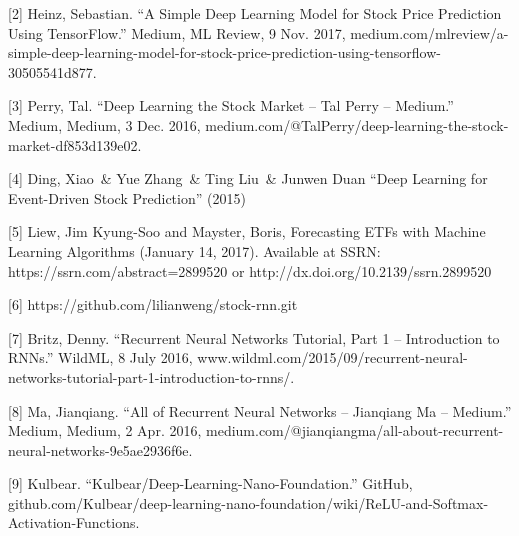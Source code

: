 \documentclass{article}
\begin{document}
[2] Heinz, Sebastian. “A Simple Deep Learning Model for Stock Price Prediction Using TensorFlow.” Medium, ML Review, 9 Nov. 2017, medium.com/mlreview/a-simple-deep-learning-model-for-stock-price-prediction-using-tensorflow-30505541d877.

[3] Perry, Tal. “Deep Learning the Stock Market – Tal Perry – Medium.” Medium, Medium, 3 Dec. 2016, medium.com/@TalPerry/deep-learning-the-stock-market-df853d139e02.

[4] Ding, Xiao\ \& Yue Zhang\ \& Ting Liu\ \& Junwen Duan “Deep Learning for Event-Driven Stock Prediction” (2015)

[5] Liew, Jim Kyung-Soo and Mayster, Boris, Forecasting ETFs with Machine Learning Algorithms (January 14, 2017). Available at SSRN: https://ssrn.com/abstract=2899520 or http://dx.doi.org/10.2139/ssrn.2899520

[6] https://github.com/lilianweng/stock-rnn.git

[7] Britz, Denny. “Recurrent Neural Networks Tutorial, Part 1 – Introduction to RNNs.” WildML, 8 July 2016, www.wildml.com/2015/09/recurrent-neural-networks-tutorial-part-1-introduction-to-rnns/.

[8] Ma, Jianqiang. “All of Recurrent Neural Networks – Jianqiang Ma – Medium.” Medium, Medium, 2 Apr. 2016, medium.com/@jianqiangma/all-about-recurrent-neural-networks-9e5ae2936f6e.

[9] Kulbear. “Kulbear/Deep-Learning-Nano-Foundation.” GitHub, github.com/Kulbear/deep-learning-nano-foundation/wiki/ReLU-and-Softmax-Activation-Functions.
\end{document}
